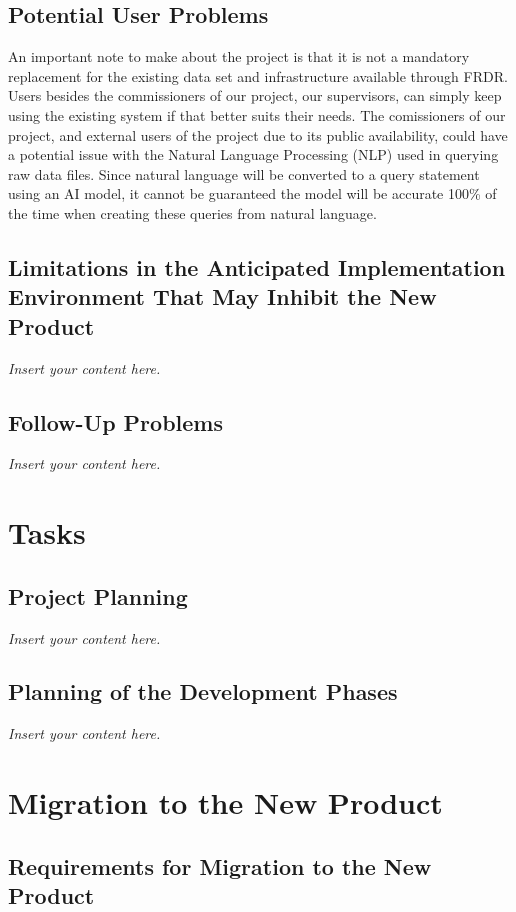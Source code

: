\documentclass[12pt]{article}
\newcommand{\lips}{\textit{Insert your content here.}}
\begin{document}
\subsection{Potential User Problems}

\par{An important note to make about the project is that it is not a mandatory replacement for the existing data set and infrastructure 
available through FRDR. Users besides the commissioners of our project, our supervisors, can simply keep using the existing system 
if that better suits their needs. \newline \indent The comissioners of our project, and external users of the project due to its public 
availability, could have a potential issue with the Natural Language Processing (NLP) used in querying raw data files. Since natural language 
will be converted to a query statement using an AI model, it cannot be guaranteed the model will be accurate 100\% of the time when 
creating these queries from natural language.}

\subsection{Limitations in the Anticipated Implementation Environment That May
Inhibit the New Product}
\lips
\subsection{Follow-Up Problems}
\lips

\section{Tasks}
\subsection{Project Planning}
\lips
\subsection{Planning of the Development Phases}
\lips

\section{Migration to the New Product}
\subsection{Requirements for Migration to the New Product}
\end{document}
